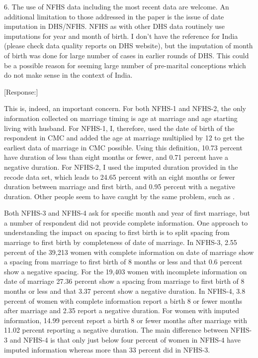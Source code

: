 \documentclass[letterpaper,12pt]{article}
\begin{document}
6. The use of NFHS data including the most recent data are welcome. An
additional limitation to those addressed in the paper is the issue of
date imputation in DHS/NFHS. NFHS as with other DHS data routinely use
imputations for year and month of birth. I don’t have the reference for
India (please check data quality reports on DHS website), but the
imputation of month of birth was done for large number of cases in
earlier rounds of DHS. This could be a possible reason for seeming large
number of pre-marital conceptions which do not make sense in the context
of India.

[Response:]

This is, indeed, an important concern.
For both NFHS-1 and NFHS-2, the only information collected on marriage timing is age at 
marriage and age starting living with husband.
For NFHS-1, I, therefore, used the date of birth of the respondent in CMC and added the 
age at marriage multiplied by 12 to get the earliest data of marriage in CMC possible.
Using this definition, 10.73 percent have duration of less than eight months or fewer, and
0.71 percent have a negative duration.
For NFHS-2, I used the imputed duration provided in the recode data set, which leads to 
24.65 percent with an eight months or fewer duration between marriage and first birth, 
and 0.95 percent with a negative duration.
Other people seem to have caught by the same problem, such as \citet{Padmadas2004}.

Both NFHS-3 and NFHS-4 ask for specific month and year of first marriage, but a number of
respondent did not provide complete information.
One approach to understanding the impact on spacing to first birth is to split spacing 
from marriage to first birth by completeness of date of marriage.
In NFHS-3, 2.55 percent of the 39,213 women with complete information on date of 
marriage show a spacing from marriage to first birth of 8 months or less and that 0.6 
percent show a negative spacing. 
For the 19,403 women with incomplete information on date of marriage 27.36 percent show
a spacing from marriage to first birth of 8 months or less and that 3.37 percent show a 
negative duration.
In NFHS-4, 3.8 percent of women with complete information report a birth 8 or fewer months
after marriage and 2.35 report a negative duration.
For women with imputed information, 14.99 percent report a birth 8 or fewer months
after marriage with 11.02 percent reporting a negative duration.
The main difference between NFHS-3 and NFHS-4 is that only just below four percent of 
women in NFHS-4 have imputed information whereas more than 33 percent did in NFHS-3.
\end{document}
